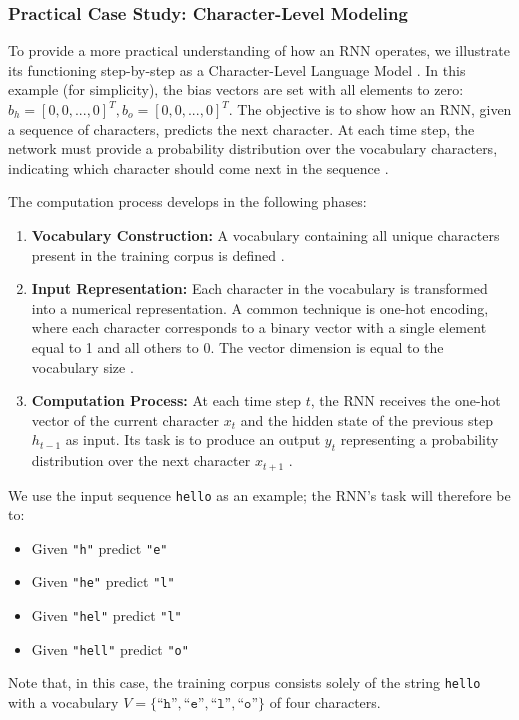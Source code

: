 \subsubsection{Practical Case Study: Character-Level Modeling}
To provide a more practical understanding of how an RNN operates, we illustrate its functioning step-by-step as a Character-Level Language Model \cite{cs231n-rnn}. In this example (for simplicity), the bias vectors are set with all elements to zero: $b_h = [0,0,...,0]^T,b_o = [0,0,...,0]^T$. The objective is to show how an RNN, given a sequence of characters, predicts the next character. At each time step, the network must provide a probability distribution over the vocabulary characters, indicating which character should come next in the sequence \cite{cs231n-rnn, quarkml-rnn-explained}.

The computation process develops in the following phases:
\begin{enumerate}
\item \textbf{Vocabulary Construction:} A vocabulary containing all unique characters present in the training corpus is defined \cite{cs231n-rnn}.

\item \textbf{Input Representation:} Each character in the vocabulary is transformed into a numerical representation. A common technique is one-hot encoding, where each character corresponds to a binary vector with a single element equal to 1 and all others to 0. The vector dimension is equal to the vocabulary size \cite{quarkml-rnn-explained}.

\item \textbf{Computation Process:} At each time step $t$, the RNN receives the one-hot vector of the current character $x_t$ and the hidden state of the previous step $h_{t-1}$ as input. Its task is to produce an output $y_t$ representing a probability distribution over the next character $x_{t+1}$ \cite{cs231n-rnn, medium_math_rnn}.

\end{enumerate}

We use the input sequence \texttt{hello} as an example; the RNN's task will therefore be to:
\begin{itemize}
\item Given \texttt{"h"} predict \texttt{"e"}
\item Given \texttt{"he"} predict \texttt{"l"}
\item Given \texttt{"hel"} predict \texttt{"l"}
\item Given \texttt{"hell"} predict \texttt{"o"}
\end{itemize}
Note that, in this case, the training corpus consists solely of the string \texttt{hello} with a vocabulary $V=\{\texttt{``h''}, \texttt{``e''}, \texttt{``l''}, \texttt{``o''}\}$ of four characters.

